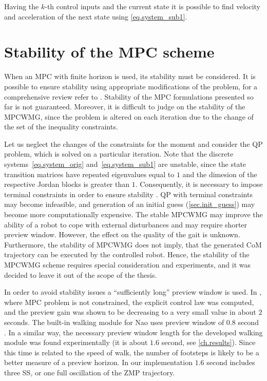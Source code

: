 Having the $k$-th control inputs and the current state it is possible to find 
velocity and acceleration of the next state using \cref{eq.system_sub1}.


\section{Stability of the MPC scheme}\label{sec.mpc_stability}
When an \ac{MPC} with finite horizon is used, its stability must be considered.
It is possible to ensure stability using appropriate modifications of the problem,
for a comprehensive review refer to \cite{MPCstab}. Stability of the \ac{MPC} 
formulations presented so far is not guaranteed. Moreover, it is difficult to
judge on the stability of the \ac{MPCWMG}, since the problem is altered on each 
iteration due to the change of the set of the inequality constraints.

Let us neglect the changes of the constraints for the moment and consider the 
\ac{QP} problem, which is solved on a particular iteration. Note that the discrete 
systems~\eqref{eq.system_orig} and~\eqref{eq.system_sub1} are unstable, since the 
state transition matrices have repeated eigenvalues equal to $1$ and the dimesion 
of the respective Jordan blocks is greater than $1$. Consequently, it is necessary to 
impose terminal constraints in order to ensure stability \cite{MuskeLinearMPC}. 
\ac{QP} with terminal constraints may become infeasible, and generation of an initial 
guess (\cref{sec.init_guess}) may become more computationally expensive. The stable 
\ac{MPCWMG} may improve the ability of a robot to cope with external disturbances 
and may require shorter preview window. However, the effect on the quality of the 
gait is unknown. Furthermore, the stability of \ac{MPCWMG} does not imply, that the 
generated \ac{CoM} trajectory can be executed by the controlled robot. Hence, the 
stability of the \ac{MPCWMG} scheme requires special consideration and experiments, 
and it was decided to leave it out of the scope of the thesis.

In order to avoid stability issues a ``sufficiently long'' preview window is
used. In \cite{LIPM-MPC}, where \ac{MPC} problem is not constrained, the explicit 
control law was computed, and the preview gain was shown to be decreasing to a very
small value in about $2$ seconds. The built-in walking module for Nao uses preview 
window of $0.8$ second \cite{NaoWalk}. In a similar way, the necessary preview window 
length for the developed walking module was found experimentally (it is about $1.6$ 
second, see \cref{ch.results}). Since this time is related to the speed of walk, 
the number of footsteps is likely to be a better measure of a preview horizon. In our 
implementation $1.6$ second includes three \ac{SS}, or one full oscillation of the 
\ac{ZMP} trajectory.

